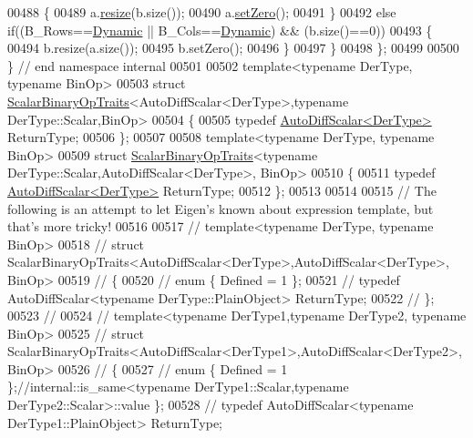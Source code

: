 \begin{DoxyCode}
00488     \{
00489       a.\hyperlink{class_eigen_1_1_plain_object_base_a99d9054ee2d5a40c6e00ded0265e9cea}{resize}(b.size());
00490       a.\hyperlink{class_eigen_1_1_plain_object_base_ac21ad5f989f320e46958b75ac8d9a1da}{setZero}();
00491     \}
00492     \textcolor{keywordflow}{else} \textcolor{keywordflow}{if}((B\_Rows==\hyperlink{namespace_eigen_ad81fa7195215a0ce30017dfac309f0b2}{Dynamic} || B\_Cols==\hyperlink{namespace_eigen_ad81fa7195215a0ce30017dfac309f0b2}{Dynamic}) && (b.size()==0))
00493     \{
00494       b.resize(a.size());
00495       b.setZero();
00496     \}
00497   \}
00498 \};
00499 
00500 \} \textcolor{comment}{// end namespace internal}
00501 
00502 \textcolor{keyword}{template}<\textcolor{keyword}{typename} DerType, \textcolor{keyword}{typename} BinOp>
00503 \textcolor{keyword}{struct }\hyperlink{group___core___module_struct_eigen_1_1_scalar_binary_op_traits}{ScalarBinaryOpTraits}<AutoDiffScalar<DerType>,typename DerType::Scalar,BinOp>
00504 \{
00505   \textcolor{keyword}{typedef} \hyperlink{class_eigen_1_1_auto_diff_scalar}{AutoDiffScalar<DerType>} ReturnType;
00506 \};
00507 
00508 \textcolor{keyword}{template}<\textcolor{keyword}{typename} DerType, \textcolor{keyword}{typename} BinOp>
00509 \textcolor{keyword}{struct }\hyperlink{group___core___module_struct_eigen_1_1_scalar_binary_op_traits}{ScalarBinaryOpTraits}<typename DerType::Scalar,AutoDiffScalar<DerType>, BinOp>
00510 \{
00511   \textcolor{keyword}{typedef} \hyperlink{class_eigen_1_1_auto_diff_scalar}{AutoDiffScalar<DerType>} ReturnType;
00512 \};
00513 
00514 
00515 \textcolor{comment}{// The following is an attempt to let Eigen's known about expression template, but that's more tricky!}
00516 
00517 \textcolor{comment}{// template<typename DerType, typename BinOp>}
00518 \textcolor{comment}{// struct ScalarBinaryOpTraits<AutoDiffScalar<DerType>,AutoDiffScalar<DerType>, BinOp>}
00519 \textcolor{comment}{// \{}
00520 \textcolor{comment}{//   enum \{ Defined = 1 \};}
00521 \textcolor{comment}{//   typedef AutoDiffScalar<typename DerType::PlainObject> ReturnType;}
00522 \textcolor{comment}{// \};}
00523 \textcolor{comment}{//}
00524 \textcolor{comment}{// template<typename DerType1,typename DerType2, typename BinOp>}
00525 \textcolor{comment}{// struct ScalarBinaryOpTraits<AutoDiffScalar<DerType1>,AutoDiffScalar<DerType2>, BinOp>}
00526 \textcolor{comment}{// \{}
00527 \textcolor{comment}{//   enum \{ Defined = 1 \};//internal::is\_same<typename DerType1::Scalar,typename DerType2::Scalar>::value
       \};}
00528 \textcolor{comment}{//   typedef AutoDiffScalar<typename DerType1::PlainObject> ReturnType;}

\end{DoxyCode}
